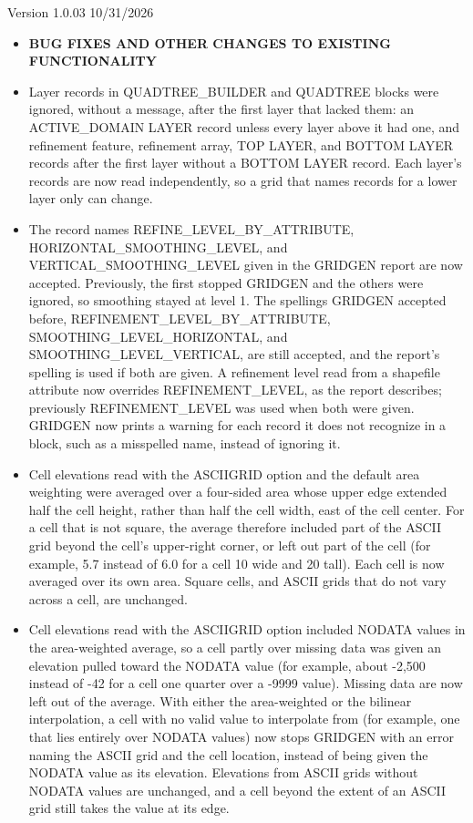 \item Version 1.0.03 10/31/2026
\begin{itemize}[label=--]
  \item[] \textbf{BUG FIXES AND OTHER CHANGES TO EXISTING FUNCTIONALITY}
  \item Layer records in QUADTREE\_BUILDER and QUADTREE blocks were ignored, without a message, after the first layer that lacked them: an ACTIVE\_DOMAIN LAYER record unless every layer above it had one, and refinement feature, refinement array, TOP LAYER, and BOTTOM LAYER records after the first layer without a BOTTOM LAYER record. Each layer's records are now read independently, so a grid that names records for a lower layer only can change.
  \item The record names REFINE\_LEVEL\_BY\_ATTRIBUTE, HORIZONTAL\_SMOOTHING\_LEVEL, and VERTICAL\_SMOOTHING\_LEVEL given in the GRIDGEN report are now accepted. Previously, the first stopped GRIDGEN and the others were ignored, so smoothing stayed at level 1. The spellings GRIDGEN accepted before, REFINEMENT\_LEVEL\_BY\_ATTRIBUTE, SMOOTHING\_LEVEL\_HORIZONTAL, and SMOOTHING\_LEVEL\_VERTICAL, are still accepted, and the report's spelling is used if both are given. A refinement level read from a shapefile attribute now overrides REFINEMENT\_LEVEL, as the report describes; previously REFINEMENT\_LEVEL was used when both were given. GRIDGEN now prints a warning for each record it does not recognize in a block, such as a misspelled name, instead of ignoring it.
  \item Cell elevations read with the ASCIIGRID option and the default area weighting were averaged over a four-sided area whose upper edge extended half the cell height, rather than half the cell width, east of the cell center. For a cell that is not square, the average therefore included part of the ASCII grid beyond the cell's upper-right corner, or left out part of the cell (for example, 5.7 instead of 6.0 for a cell 10 wide and 20 tall). Each cell is now averaged over its own area. Square cells, and ASCII grids that do not vary across a cell, are unchanged.
  \item Cell elevations read with the ASCIIGRID option included NODATA values in the area-weighted average, so a cell partly over missing data was given an elevation pulled toward the NODATA value (for example, about -2,500 instead of -42 for a cell one quarter over a -9999 value). Missing data are now left out of the average. With either the area-weighted or the bilinear interpolation, a cell with no valid value to interpolate from (for example, one that lies entirely over NODATA values) now stops GRIDGEN with an error naming the ASCII grid and the cell location, instead of being given the NODATA value as its elevation. Elevations from ASCII grids without NODATA values are unchanged, and a cell beyond the extent of an ASCII grid still takes the value at its edge.

\end{itemize}

